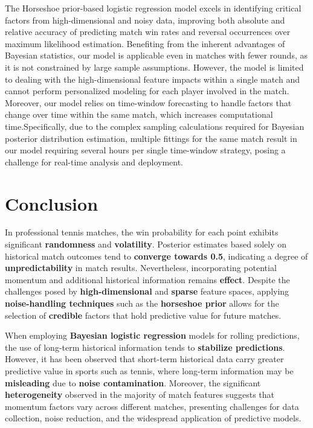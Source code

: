 \documentclass{mcmthesis}
\begin{document}
The Horseshoe prior-based logistic regression model excels in identifying critical factors from high-dimensional and noisy data, improving both absolute and relative accuracy of predicting match win rates and reversal occurrences over maximum likelihood estimation. Benefiting from the inherent advantages of Bayesian statistics, our model is applicable even in matches with fewer rounds, as it is not constrained by large sample assumptions. However, the model is limited to dealing with the high-dimensional feature impacts within a single match and cannot perform personalized modeling for each player involved in the match. Moreover, our model relies on time-window forecasting to handle factors that change over time within the same match, which increases computational time.Specifically, due to the complex sampling calculations required for Bayesian posterior distribution estimation, multiple fittings for the same match result in our model requiring several hours per single time-window strategy, posing a challenge for real-time analysis and deployment.

\section{Conclusion}

In professional tennis matches, the win probability for each point exhibits significant \textbf{randomness} and \textbf{volatility}. Posterior estimates based solely on historical match outcomes tend to \textbf{converge towards 0.5}, indicating a degree of \textbf{unpredictability} in match results. Nevertheless, incorporating potential momentum and additional historical information remains \textbf{effect}. Despite the challenges posed by \textbf{high-dimensional} and \textbf{sparse} feature spaces, applying \textbf{noise-handling techniques} such as the \textbf{horseshoe prior} allows for the selection of \textbf{credible} factors that hold predictive value for future matches. 

When employing \textbf{Bayesian logistic regression} models for rolling predictions, the use of long-term historical information tends to \textbf{stabilize predictions}. However, it has been observed that short-term historical data carry greater predictive value in sports such as tennis, where long-term information may be \textbf{misleading} due to \textbf{noise contamination}. Moreover, the significant \textbf{heterogeneity} observed in the majority of match features suggests that momentum factors vary across different matches, presenting challenges for data collection, noise reduction, and the widespread application of predictive models.
\end{document}
